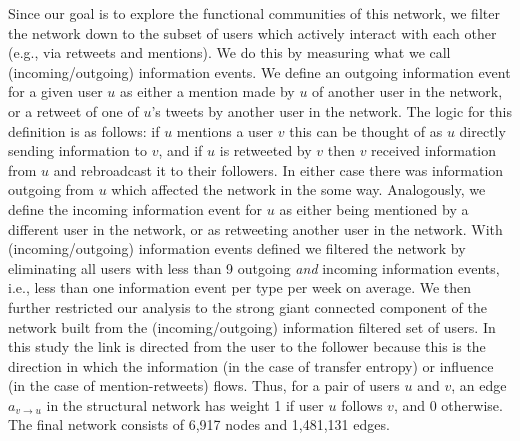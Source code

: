 Since our goal is to explore the functional communities of this network, we filter the network down to the subset of users which actively interact with each other (e.g., via retweets and mentions). We do this by measuring what we call (incoming/outgoing) information events. We define an outgoing information event for a given user $u$ as either a mention made by $u$ of another user in the network, or a retweet of one of $u$'s tweets by another user in the network. The logic for this definition is as follows: if $u$ mentions a user $v$ this can be thought of as $u$ directly sending information to $v$, and if $u$ is retweeted by $v$ then $v$ received information from $u$ and rebroadcast it to their followers. In either case there was information outgoing from $u$ which affected the network in the some way. Analogously, we define the incoming information event for $u$ as either being mentioned by a different user in the network, or as retweeting another user in the network.
With (incoming/outgoing) information events defined we filtered the network by eliminating all users with less than 9 outgoing \emph{and} incoming information events, i.e., less than one information event per type per week on average. 
We then further restricted our analysis to the strong giant connected component of the network built from the (incoming/outgoing) information filtered set of users. %
In this study the link is directed from the user to the follower because this is the direction in which the information (in the case of transfer entropy) or influence (in the case of mention-retweets) flows. Thus, for a pair of users $u$ and $v$, an edge $a_{v \to u}$ in the structural network has weight 1 if user $u$ follows $v$, and 0 otherwise. The final network consists of 6,917 nodes and 1,481,131 edges.

